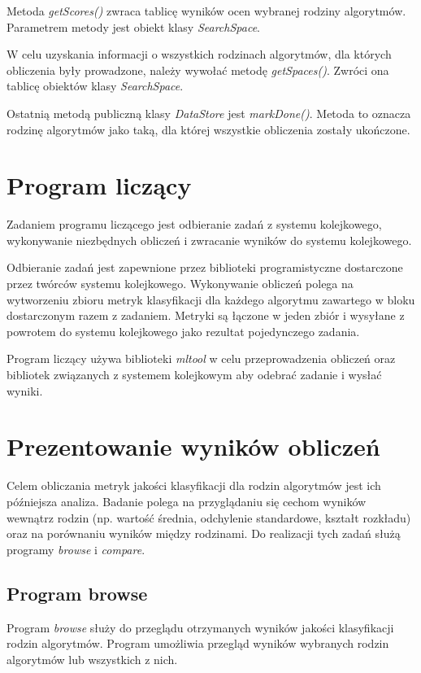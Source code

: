 \documentclass[../thesis.tex]{subfiles}
\begin{document}
Metoda \emph{getScores()} zwraca tablicę wyników ocen wybranej rodziny algorytmów. Parametrem metody jest obiekt klasy \emph{SearchSpace}.

W celu uzyskania informacji o wszystkich rodzinach algorytmów, dla których obliczenia były prowadzone, należy wywołać metodę \emph{getSpaces()}. Zwróci ona tablicę obiektów klasy \emph{SearchSpace}.

Ostatnią metodą publiczną klasy \emph{DataStore} jest \emph{markDone()}. Metoda to oznacza rodzinę algorytmów jako taką, dla której wszystkie obliczenia zostały ukończone.

\section{Program liczący}

Zadaniem programu liczącego jest odbieranie zadań z systemu kolejkowego, wykonywanie niezbędnych obliczeń i zwracanie wyników do systemu kolejkowego.

Odbieranie zadań jest zapewnione przez biblioteki programistyczne dostarczone przez twórców systemu kolejkowego. Wykonywanie obliczeń polega na wytworzeniu zbioru metryk klasyfikacji dla każdego algorytmu zawartego w bloku dostarczonym razem z zadaniem. Metryki są łączone w jeden zbiór i wysyłane z powrotem do systemu kolejkowego jako rezultat pojedynczego zadania.

Program liczący używa biblioteki \emph{mltool} w celu przeprowadzenia obliczeń oraz bibliotek związanych z systemem kolejkowym aby odebrać zadanie i wysłać wyniki.

\section{Prezentowanie wyników obliczeń}

Celem obliczania metryk jakości klasyfikacji dla rodzin algorytmów jest ich późniejsza analiza. Badanie polega na przyglądaniu się cechom wyników wewnątrz rodzin (np. wartość średnia, odchylenie standardowe, kształt rozkładu) oraz na porównaniu wyników między rodzinami. Do realizacji tych zadań służą programy \emph{browse} i \emph{compare}.

\subsection{Program browse}

Program \emph{browse} służy do przeglądu otrzymanych wyników jakości klasyfikacji rodzin algorytmów. Program umożliwia przegląd wyników wybranych rodzin algorytmów lub wszystkich z nich.
\end{document}

